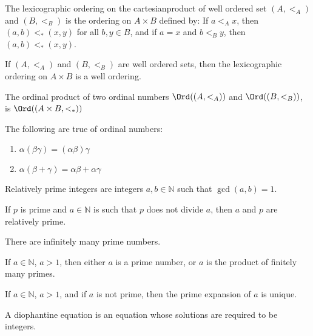     \begin{definition}
        The lexicographic ordering on the cartesianproduct of well
        ordered set $(A,<_{A})$ and $(B,<_{B})$ is the ordering on
        ${A}\times{B}$ defined by: If ${a}<_{A}{x}$, then
        $(a,b)<_{*}(x,y)$ for all $b,y\in{B}$, and if $a=x$ and
        $b<_{B}y$, then $(a,b)<_{*}(x,y)$.
    \end{definition}
    \begin{theorem}
        If $(A,<_{A})$ and $(B,<_{B})$ are well ordered sets, then the
        lexicographic ordering on ${A}\times{B}$ is a well ordering.
    \end{theorem}
    \begin{definition}
        The ordinal product of two ordinal numbers
        $\Ord((A,<_{A}))$ and $\Ord((B,<_{B}))$,
        is $\Ord(({A}\times{B},<_{*}))$
    \end{definition}
    \begin{theorem}
        The following are true of ordinal numbers:
        \begin{enumerate}
            \item $\alpha(\beta\gamma)=(\alpha\beta)\gamma$
            \item $\alpha(\beta+\gamma)=\alpha\beta+\alpha\gamma$
        \end{enumerate}
    \end{theorem}
    \begin{definition}
       Relatively prime integers are integers
       $a,b\in\mathbb{N}$ such that $\gcd(a,b)=1$.
    \end{definition}
    \begin{theorem}
       If $p$ is prime and $a\in\mathbb{N}$ is
       such that $p$ does not divide $a$, then $a$ and $p$
       are relatively prime.
    \end{theorem}
    \begin{theorem}
       There are infinitely many prime numbers.
    \end{theorem}
    \begin{theorem}
       If $a\in\mathbb{N}$, $a>1$, then either
       $a$ is a prime number, or $a$ is the product
       of finitely many primes.
    \end{theorem}
    \begin{theorem}
       If $a\in\mathbb{N}$, $a>1$, and if $a$ is not
       prime, then the prime expansion of $a$ is
       unique.
    \end{theorem}
    \begin{definition}
       A diophantine equation is an equation whose
       solutions are required to be integers.
    \end{definition}
